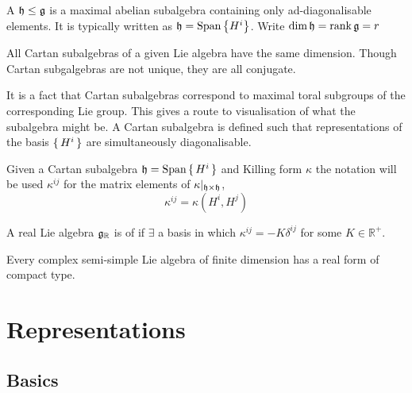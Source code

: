 \documentclass{article}
\begin{document}
\begin{definition}
A  $\mathfrak{h}\leq\mathfrak{g}$ is a maximal abelian subalgebra containing only ad-diagonalisable elements. It is typically written as $\mathfrak{h}=\operatorname{Span}\left\{ H^i \right\}$. Write $\dim{\mathfrak{h}}=\operatorname{rank}{\mathfrak{g}}=r$
\end{definition}

\begin{fact}
All Cartan subalgebras of a given Lie algebra have the same dimension. Though Cartan subgalgebras are not unique, they are all conjugate. 
\end{fact}

\begin{idea}
It is a fact that Cartan subalgebras correspond to maximal toral subgroups of the corresponding Lie group. This gives a route to visualisation of what the subalgebra might be. A Cartan subalgebra is defined such that representations of the basis $\set{ H^i }$ are simultaneously diagonalisable. 
\end{idea}

\begin{definition}[$\kappa^{ij}$]
Given a Cartan subalgebra $\mathfrak{h}=\operatorname{Span}\set{ H^i }$ and Killing form $\kappa$ the notation will be used $\kappa^{ij}$ for the matrix elements of $\kappa |_{\mathfrak{h}\times\mathfrak{h}}$,
\[
\kappa^{ij}=\kappa(H^i, H^j)
\]
\end{definition}

\begin{definition}
A real Lie algebra $\mathfrak{g}_\mathbb{R}$ is of  if $\exists$ a basis in which $\kappa^{ij}=-K\delta^{ij}$ for some $K\in\mathbb{R}^{+}$.
\end{definition}

\begin{fact}
Every complex semi-simple Lie algebra of finite dimension has a real form of compact type.
\end{fact}

\section{Representations}

\subsection{Basics}
\end{document}
